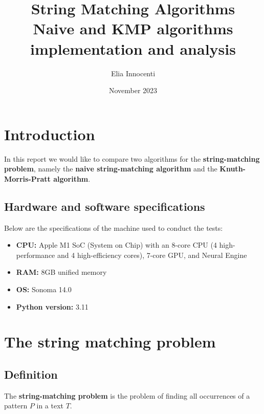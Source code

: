 \documentclass[11pt]{article}
\title{String Matching Algorithms \\
       \vspace{0.5em}
       \large Naive and KMP algorithms implementation and analysis}
\author{Elia Innocenti}
\date{November 2023}
\begin{document}
    \maketitle
    \tableofcontents

    \newpage

    \section{Introduction} \label{sec:introduction}

        In this report we would like to compare two algorithms for the \textbf{string-matching problem}, namely the \textbf{naive string-matching algorithm} and the \textbf{Knuth-Morris-Pratt algorithm}.

        \subsection{Hardware and software specifications} \label{subsec:hardware_software}

            Below are the specifications of the machine used to conduct the tests:
            \begin{itemize}
                \item \textbf{CPU:} Apple M1 SoC (System on Chip) with an 8-core CPU (4 high-performance and 4 high-efficiency cores), 7-core GPU, and Neural Engine
                \item \textbf{RAM:} 8GB unified memory
                \item \textbf{OS:} Sonoma 14.0
                \item \textbf{Python version:} 3.11
            \end{itemize}

    \section{The string matching problem} \label{sec:string_matching_problem}

        \subsection{Definition} \label{subsec:definition}

            The \textbf{string-matching problem} is the problem of finding all occurrences of a pattern $P$ in a text $T$. \\
\end{document}
